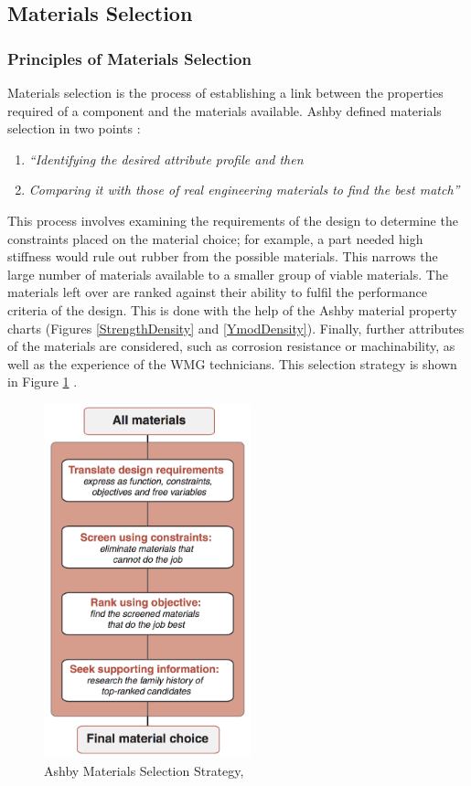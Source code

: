 \subsection{Materials Selection}
\subsubsection{Principles of Materials Selection}
Materials selection is the process of establishing a link between the properties required of a component and the materials available. Ashby defined materials selection in two points \cite{Ashby05}:

\begin{enumerate}
\item \textit{``Identifying the desired attribute profile and then}
\item \textit{Comparing it with those of real engineering materials to find the best match''}
\end{enumerate}
This process involves examining the requirements of the design to determine the constraints placed on the material choice; for example, a part needed high stiffness would rule out rubber from the possible materials. This narrows the large number of materials available to a smaller group of viable materials. The materials left over are ranked against their ability to fulfil the performance criteria of the design. This is done with the help of the Ashby material property charts (Figures \ref{StrengthDensity} and \ref{YmodDensity}). Finally, further attributes of the materials are considered, such as corrosion resistance or machinability, as well as the experience of the WMG technicians. This selection strategy is shown in Figure \ref{AshbyStrat} \cite{Ashby05}.

\begin{figure}[h!]
  \centering
\includegraphics[width=6cm]{Images/MaxImages/AshbyStrat.png}
  \caption{Ashby Materials Selection Strategy, \cite{Ashby05}}
\label{AshbyStrat}
\end{figure}

